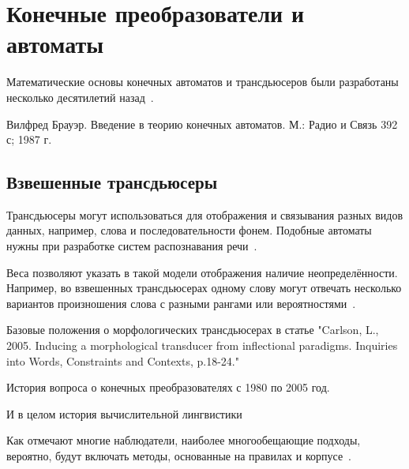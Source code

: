 \section{Конечные преобразователи и автоматы} \label{sect_review_automaton}

Математические основы конечных автоматов и трансдьюсеров были разработаны 
несколько десятилетий назад~\cite{MohriChapter4Lothaire2005applied}.


Вилфред Брауэр. Введение в теорию конечных автоматов. М.: Радио и Связь 392 с; 
1987 г. 



\subsection{Взвешенные трансдьюсеры} \label{sect_weighted_transducers}

Трансдьюсеры могут использоваться для отображения и связывания разных видов данных, 
например, слова и последовательности фонем. 
Подобные автоматы нужны при разработке систем распознавания речи~\cite[с.~200]{MohriChapter4Lothaire2005applied}.

Веса позволяют указать в такой модели отображения наличие неопределённости. 
Например, во взвешенных трансдьюсерах одному слову могут отвечать несколько вариантов 
произношения слова с разными рангами или вероятностями~\cite[с.~200]{MohriChapter4Lothaire2005applied}.


Базовые положения о морфологических трансдьюсерах в статье "Carlson, L., 2005. Inducing a morphological transducer from inflectional paradigms. Inquiries into Words, Constraints and Contexts, p.18-24."


История вопроса о конечных преобразователях с 1980 по 2005 год.

И в целом история вычислительной лингвистики 

Как отмечают многие наблюдатели, наиболее многообещающие подходы, вероятно, будут включать методы, основанные на правилах и корпусе~\cite{Hutchins1999}.








